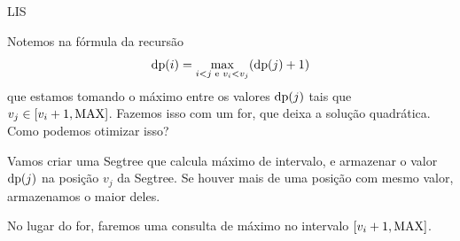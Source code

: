 \begin{frame}{LIS}

    Notemos na fórmula da recursão 
        \[ \operatorname{dp}(i) = \max_{i < j \text{ e } v_i < v_j}(\operatorname{dp}(j)+1) \]
    que estamos tomando o máximo entre os valores $\operatorname{dp}(j)$ tais que $v_j \in [v_i+1, \operatorname{MAX}]$. Fazemos isso com um for, que deixa a solução quadrática. Como podemos otimizar isso?

    Vamos criar uma Segtree que calcula máximo de intervalo, e armazenar o valor $\operatorname{dp}(j)$ na posição $v_j$ da Segtree. Se houver mais de uma posição com mesmo valor, armazenamos o maior deles.

    No lugar do for, faremos uma consulta de máximo no intervalo $[v_i+1, \operatorname{MAX}]$.

    

\end{frame}

